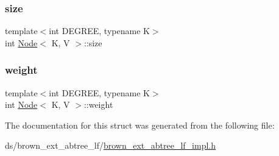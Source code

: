 \mbox{\label{structabtree__ns_1_1Node_a681685fe9668f05a34770c59772d71c2}} 
\subsubsection{\texorpdfstring{size}{size}}
{\footnotesize\ttfamily template$<$int D\+E\+G\+R\+EE, typename K$>$ \\
int \hyperlink{structabtree__ns_1_1Node}{Node}$<$ K, V $>$\+::size}

\mbox{\label{structabtree__ns_1_1Node_a85910bf98f322370af50db4fa6e8bf75}} 
\subsubsection{\texorpdfstring{weight}{weight}}
{\footnotesize\ttfamily template$<$int D\+E\+G\+R\+EE, typename K$>$ \\
int \hyperlink{structabtree__ns_1_1Node}{Node}$<$ K, V $>$\+::weight}



The documentation for this struct was generated from the following file\+:\begin{DoxyCompactItemize}
\item 
ds/brown\+\_\+ext\+\_\+abtree\+\_\+lf/\hyperlink{brown__ext__abtree__lf_2brown__ext__abtree__lf__impl_8h}{brown\+\_\+ext\+\_\+abtree\+\_\+lf\+\_\+impl.\+h}\end{DoxyCompactItemize}
